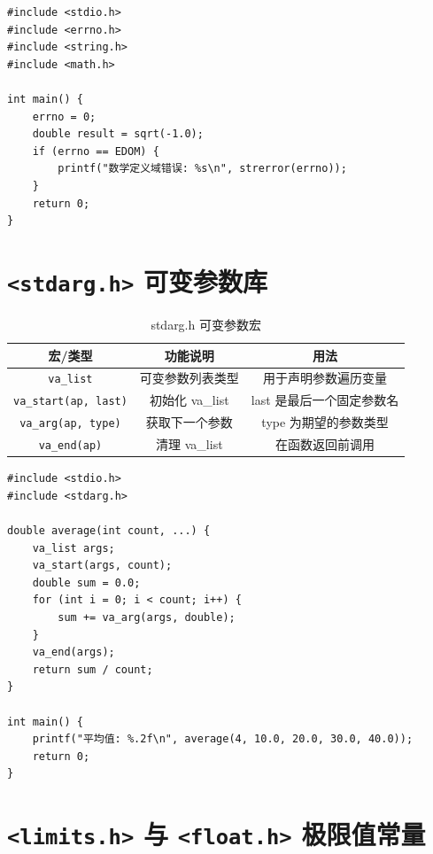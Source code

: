 \begin{lstlisting}[caption={errno 使用示例}]
#include <stdio.h>
#include <errno.h>
#include <string.h>
#include <math.h>

int main() {
    errno = 0;
    double result = sqrt(-1.0);
    if (errno == EDOM) {
        printf("数学定义域错误: %s\n", strerror(errno));
    }
    return 0;
}
\end{lstlisting}

\section{\texorpdfstring{\texttt{<stdarg.h>} 可变参数库}{<stdarg.h> 可变参数库}}

\begin{table}[H]
\centering
\renewcommand{\arraystretch}{1.6}
\begin{tabulary}{\linewidth}{CCC}
\toprule
\textbf{宏/类型} & \textbf{功能说明} & \textbf{用法} \\ \midrule
\texttt{va\_list} & 可变参数列表类型 & 用于声明参数遍历变量 \\ 
\texttt{va\_start(ap, last)} & 初始化 va\_list & last 是最后一个固定参数名 \\ 
\texttt{va\_arg(ap, type)} & 获取下一个参数 & type 为期望的参数类型 \\ 
\texttt{va\_end(ap)} & 清理 va\_list & 在函数返回前调用 \\ \bottomrule
\end{tabulary}
\caption{stdarg.h 可变参数宏}
\label{tab:stdarg_funcs}
\end{table}

\begin{lstlisting}[caption={可变参数函数示例}]
#include <stdio.h>
#include <stdarg.h>

double average(int count, ...) {
    va_list args;
    va_start(args, count);
    double sum = 0.0;
    for (int i = 0; i < count; i++) {
        sum += va_arg(args, double);
    }
    va_end(args);
    return sum / count;
}

int main() {
    printf("平均值: %.2f\n", average(4, 10.0, 20.0, 30.0, 40.0));
    return 0;
}
\end{lstlisting}

\section{\texorpdfstring{\texttt{<limits.h>} 与 \texttt{<float.h>} 极限值常量}{<limits.h> 与 <float.h> 极限值常量}}

